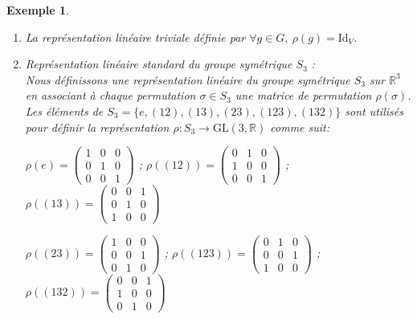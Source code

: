 \documentclass[a4paper, 14pt]{report}
\newtheorem{example}{Exemple}[section]
\begin{document}
\begin{onehalfspace}
{			
			\begin{example}\
				\begin{enumerate}
					\item La représentation linéaire triviale définie par \(\forall g \in G, \ \rho(g) = \mathrm{Id}_V\).
					\item Représentation linéaire standard du groupe symétrique \( S_3 \) :\\
					Nous définissons une représentation linéaire du groupe symétrique \( S_3 \) sur \( \mathbb{R}^3 \) en associant à chaque permutation \( \sigma \in S_3 \) une matrice de permutation \( \rho(\sigma) \). Les éléments de \( S_3 = \{e, (12), (13), (23), (123), (132)\} \) sont utilisés pour définir la représentation \( \rho : S_3 \to \mathrm{GL}(3, \mathbb{R}) \) comme suit:
					
					\(	\rho(e) = \begin{pmatrix}
						1 & 0 & 0 \\
						0 & 1 & 0 \\
						0 & 0 & 1
					\end{pmatrix} 
					\) 	
					;
					\(
					\rho((12)) = \begin{pmatrix}
						0 & 1 & 0 \\
						1 & 0 & 0 \\
						0 & 0 & 1
					\end{pmatrix}
					\)
					;		
					\(
					\rho((13)) = \begin{pmatrix}
						0 & 0 & 1 \\
						0 & 1 & 0 \\
						1 & 0 & 0
					\end{pmatrix}
					\)
					
					
					\(
					\rho((23)) = \begin{pmatrix}
						1 & 0 & 0 \\
						0 & 0 & 1 \\
						0 & 1 & 0
					\end{pmatrix}
					\)
					;
					\(
					\rho((123)) = \begin{pmatrix}
						0 & 1 & 0 \\
						0 & 0 & 1 \\
						1 & 0 & 0
					\end{pmatrix}
					\)
					;		
					\(
					\rho((132)) = \begin{pmatrix}
						0 & 0 & 1 \\
						1 & 0 & 0 \\
						0 & 1 & 0
					\end{pmatrix}
					\)
					

\end{enumerate}
\end{example}}
\end{onehalfspace}
\end{document}
